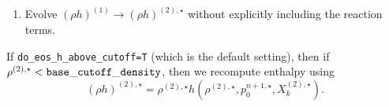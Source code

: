 \begin{description}
\begin{enumerate}
\begin{enumerate}
  \item Evolve $(\rho h)^{(1)} \rightarrow (\rho h)^{(2),\star}$ without
  explicitly including the reaction terms.


\end{enumerate}

If {\tt do\_eos\_h\_above\_cutoff=T} (which is the default setting), then if
$\rho^{(2),\star} < {\tt base\_cutoff\_density}$, then we recompute enthalpy using
\begin{equation}
(\rho h)^{(2),\star} = \rho^{(2),\star}h\left(\rho^{(2),\star},p_0^{n+1,\star},X_k^{(2),\star}\right).
\end{equation}




\end{enumerate}
\end{description}

